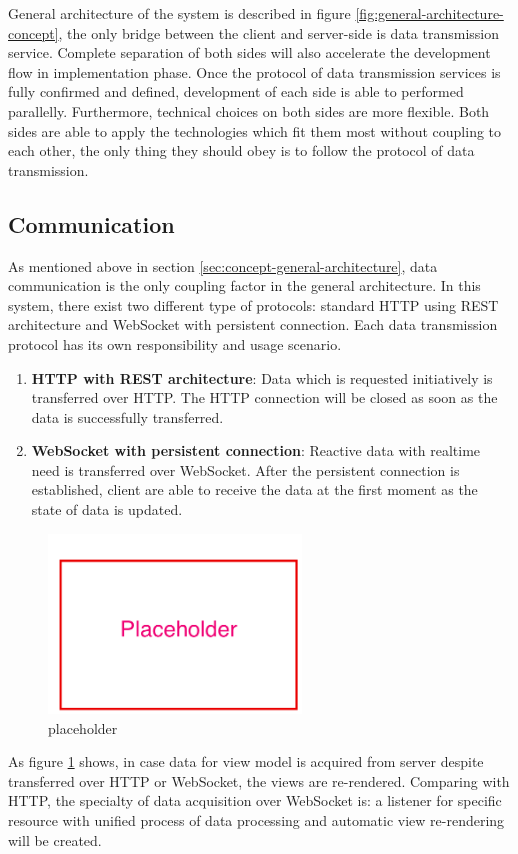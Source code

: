 General architecture of the system is described in figure \ref{fig:general-architecture-concept}, the only bridge between the client and server-side is data transmission service. Complete separation of both sides will also accelerate the development flow in implementation phase. Once the protocol of data transmission services is fully confirmed and defined, development of each side is able to performed parallelly. Furthermore, technical choices on both sides are more flexible. Both sides are able to apply the technologies which fit them most without coupling to each other, the only thing they should obey is to follow the protocol of data transmission.

\subsection{Communication} \label{subsection:concept-general-communication}
As mentioned above in section \ref{sec:concept-general-architecture}, data communication is the only coupling factor in the general architecture. In this system, there exist two different type of protocols: standard HTTP using REST architecture and WebSocket with persistent connection. Each data transmission protocol has its own responsibility and usage scenario.

\begin{enumerate}
\item
\textbf{HTTP with REST architecture}: Data which is requested initiatively is transferred over HTTP. The HTTP connection will be closed as soon as the data is successfully transferred.
\item
\textbf{WebSocket with persistent connection}: Reactive data with realtime need is transferred over WebSocket. After the persistent connection is established, client are able to receive the data at the first moment as the state of data is updated. 
\end{enumerate}

\begin{figure}[!htbp]
  \centering
    \includegraphics[width=0.6\textwidth]{Figures/placeholder.png}
  \caption{placeholder}
  \label{fig:general-data-communication-concept}
\end{figure}

As figure \ref{fig:general-data-communication-concept} shows, in case data for view model is acquired from server despite transferred over HTTP or WebSocket, the views are re-rendered. Comparing with HTTP, the specialty of data acquisition over WebSocket is: a listener for specific resource with unified process of data processing and automatic view re-rendering will be created.
